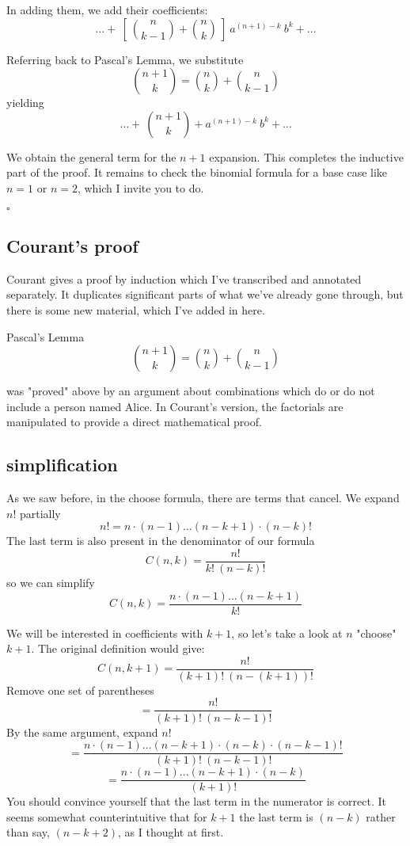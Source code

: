 \documentclass[11pt, oneside]{article}   	%
\begin{document}
In adding them, we add their coefficients:
\[  \dots +  \ [ \ {{n}\choose{k-1}} + {{n}\choose{k}} \ ] \  a^{(n+1)-k} \ b^{k} + \dots  \]

Referring back to Pascal's Lemma, we substitute
\[  {{n+1}\choose{k}} = {{n}\choose{k}} + {{n}\choose{k-1}} \]
yielding
\[  \dots +  \ {{n+1}\choose{k}} + a^{(n+1)-k} \ b^{k} + \dots  \]

We obtain the general term for the $n+1$ expansion.  This completes the inductive part of the proof.  It remains to check the binomial formula for a base case like $n=1$ or $n=2$, which I invite you to do.

$\square$

\subsection*{Courant's proof}
Courant gives a proof by induction which I've transcribed and annotated separately.  It duplicates significant parts of what we've already gone through, but there is some new material, which I've added in here.

Pascal's Lemma 
\[  {{n+1}\choose{k}} = {{n}\choose{k}} + {{n}\choose{k-1}} \]

was "proved" above by an argument about combinations which do or do not include a person named Alice.  In Courant's version, the factorials are manipulated to provide a direct mathematical proof.  

\subsection*{simplification}
As we saw before, in the choose formula, there are terms that cancel.  We expand $n!$ partially
\[ n! = n \cdot (n-1) \dots (n-k+1) \cdot (n-k)! \]
The last term is also present in the denominator of our formula
\[ C(n,k) = \frac{n!}{k! \ (n-k)!} \]
so we can simplify 
\[ C(n,k) = \frac{n \cdot (n-1) \dots (n-k+1)}{k!} \]

We will be interested in coefficients with $k+1$, so let's take a look at $n$ "choose" $k+1$.  The original definition would give:
\[ C(n,k+1) = \frac{n!}{(k+1)! \ (n-(k+1))!}  \]
Remove one set of parentheses
\[ = \frac{n!}{(k+1)! \ (n-k-1)!}  \]
By the same argument, expand $n!$
\[ = \frac{n \cdot (n-1) \dots (n-k+1) \cdot (n-k) \cdot (n-k-1)!}{(k+1)! \ (n-k-1)!}  \]
\[ = \frac{n \cdot (n-1) \dots (n-k+1) \cdot (n-k)}{(k+1)!} \]
You should convince yourself that the last term in the numerator is correct.  It seems somewhat counterintuitive that for $k+1$ the last term is $(n-k)$ rather than say, $(n-k+2)$, as I thought at first.
\end{document}
